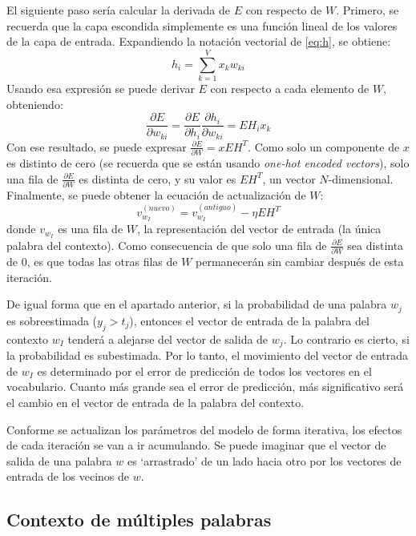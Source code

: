 El siguiente paso sería calcular la derivada de $E$ con respecto de $W$. Primero, se recuerda que la capa escondida simplemente es una función lineal de los valores de la capa de entrada. Expandiendo
la notación vectorial de \ref*{eq:h}, se obtiene:
\begin{equation}
  h_i=\sum_{k=1}^Vx_kw_{ki}
\end{equation}
Usando esa expresión se puede derivar $E$ con respecto a cada elemento de $W$, obteniendo:
\begin{equation}
  \frac{\partial E}{\partial w_{ki}} = \frac{\partial E}{\partial h_i} \frac{\partial h_i}{\partial w_{ki}} = EH_i x_k
\end{equation}
Con ese resultado, se puede expresar $\frac{\partial E}{\partial W}=xEH^T$. Como solo un componente de $x$ es distinto de cero (se recuerda que se están usando \textit{one-hot encoded vectors}), solo
una fila de $\frac{\partial E}{\partial W}$ es distinta de cero, y su valor es $EH^T$, un vector $N$-dimensional.  Finalmente, se puede obtener la ecuación de actualización de $W$:
\begin{equation}
  v_{w_I}^{(nuevo)} = v_{w_I}^{(antiguo)} - \eta EH^T
\end{equation}
donde $v_{w_I}$ es una fila de $W$, la representación del vector de entrada (la única palabra del contexto). Como consecuencia de que solo una fila de $\frac{\partial E}{\partial W}$ sea distinta de 0,
es que todas las otras filas de $W$ permanecerán sin cambiar después de esta iteración.

De igual forma que en el apartado anterior, si la probabilidad de una palabra $w_j$ es sobreestimada ($y_j>t_j$), entonces el vector de entrada de la palabra del contexto $w_I$ tenderá a alejarse del vector de salida
de $w_j$. Lo contrario es cierto, si la probabilidad es subestimada. Por lo tanto, el movimiento del vector de entrada de $w_I$ es determinado por el error de predicción de todos los vectores en el vocabulario. Cuanto más
grande sea el error de predicción, más significativo será el cambio en el vector de entrada de la palabra del contexto.

Conforme se actualizan los parámetros del modelo de forma iterativa, los efectos de cada iteración se van a ir acumulando. Se puede imaginar que el vector de salida de una palabra $w$ es `arrastrado' de un lado hacia otro
por los vectores de entrada de los vecinos de $w$.
\subsection{Contexto de múltiples palabras}

